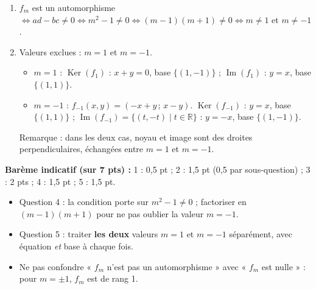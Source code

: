 \documentclass[11pt]{article}
\begin{document}
\begin{corrige}
\begin{enumerate}
\item $f_m$ est un automorphisme $\iff ad-bc\neq 0 \iff m^2-1\neq 0 \iff (m-1)(m+1)\neq 0 \iff m\neq 1$ et $m\neq -1$.
\item Valeurs exclues : $m=1$ et $m=-1$.
\begin{itemize}
\item $m=1$ : $\operatorname{Ker}(f_1)$ : $x+y=0$, base $\{(1,-1)\}$ ; $\operatorname{Im}(f_1)$ : $y=x$, base $\{(1,1)\}$.
\item $m=-1$ : $f_{-1}(x,y)=(-x+y\,;\,x-y)$. $\operatorname{Ker}(f_{-1})$ : $y=x$, base $\{(1,1)\}$ ; $\operatorname{Im}(f_{-1})=\{(t,-t)\mid t\in\mathbb{R}\}$ : $y=-x$, base $\{(1,-1)\}$.
\end{itemize}
Remarque : dans les deux cas, noyau et image sont des droites perpendiculaires, échangées entre $m=1$ et $m=-1$.
\end{enumerate}

\textbf{Barème indicatif (sur 7 pts) :} 1 : 0,5 pt ; 2 : 1,5 pt (0,5 par sous-question) ; 3 : 2 pts ; 4 : 1,5 pt ; 5 : 1,5 pt.
\end{corrige}

\begin{attention}
\begin{itemize}
\item Question 4 : la condition porte sur $m^2-1\neq 0$ ; factoriser en $(m-1)(m+1)$ pour ne pas oublier la valeur $m=-1$.
\item Question 5 : traiter \textbf{les deux} valeurs $m=1$ et $m=-1$ séparément, avec équation \emph{et} base à chaque fois.
\item Ne pas confondre « $f_m$ n'est pas un automorphisme » avec « $f_m$ est nulle » : pour $m=\pm 1$, $f_m$ est de rang 1.
\end{itemize}
\end{attention}
\end{document}
